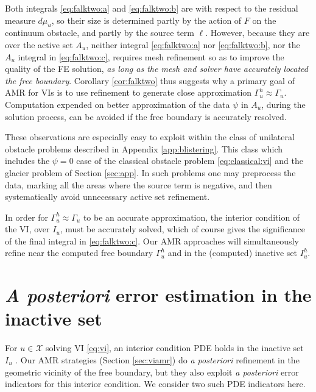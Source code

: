 \documentclass[]{interact}
\theoremstyle{plain}%
\theoremstyle{definition}
\theoremstyle{remark}
\newcommand{\cX}{\mathcal{X}}
\begin{document}
Both integrals \eqref{eq:falktwo:a} and \eqref{eq:falktwo:b} are with respect to the residual measure $d\mu_u$, so their size is determined partly by the action of $F$ on the continuum obstacle, and partly by the source term $\ell$.  However, because they are over the active set $A_u$, neither integral \eqref{eq:falktwo:a} nor \eqref{eq:falktwo:b}, nor the $A_u$ integral in \eqref{eq:falktwo:c}, requires mesh refinement so as to improve the quality of the FE solution, \emph{as long as the mesh and solver have accurately located the free boundary}.  Corollary \ref{cor:falktwo} thus suggests why a primary goal of AMR for VIs is to use refinement to generate close approximation $\Gamma_u^h\approx \Gamma_u$.  Computation expended on better approximation of the data $\psi$ in $A_u$, during the solution process, can be avoided if the free boundary is accurately resolved.

These observations are especially easy to exploit within the class of unilateral obstacle problems described in Appendix \ref{app:blistering}.  This class which includes the $\psi=0$ case of the classical obstacle problem \eqref{eq:classical:vi} and the glacier problem of Section \ref{sec:app}.  In such problems one may preprocess the data, marking all the areas where the source term is negative, and then systematically avoid unnecessary active set refinement.

In order for $\Gamma_u^h\approx \Gamma_u$ to be an accurate approximation, the interior condition of the VI, over $I_u$, must be accurately solved, which of course gives the significance of the final integral in \eqref{eq:falktwo:c}.  Our AMR approaches will simultaneously refine near the computed free boundary $\Gamma_u^h$ and in the (computed) inactive set $I_u^h$.


\section{\emph{A posteriori} error estimation in the inactive set} \label{sec:inactive}

For $u\in\cX$ solving VI \eqref{eq:vi}, an interior condition PDE holds in the inactive set $I_u$ \cite{KinderlehrerStampacchia1980}.  Our AMR strategies (Section \ref{sec:viamr}) do \emph{a posteriori} refinement in the geometric vicinity of the free boundary, but they also exploit \emph{a posteriori} error indicators for this interior condition.  We consider two such PDE indicators here.
\end{document}
